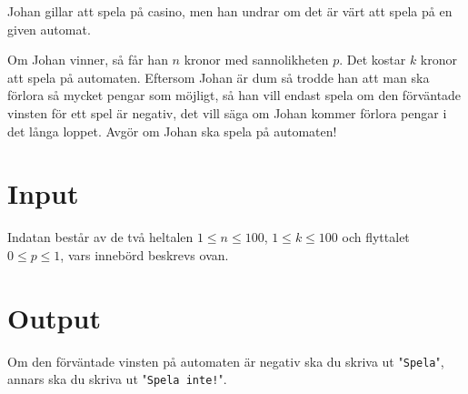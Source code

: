 

Johan gillar att spela på casino, men han undrar om det är värt att spela på en given automat. 

Om Johan vinner, så får han $n$ kronor med sannolikheten $p$.  Det kostar $k$ kronor att spela på automaten. Eftersom Johan är dum så trodde han att man ska förlora så mycket pengar som möjligt, så han vill endast spela om den förväntade vinsten för ett spel är negativ, det vill säga om Johan kommer förlora pengar i det långa loppet. Avgör om Johan ska spela på automaten!

\section*{Input}
Indatan består av de två heltalen $1 \le n \le 100$, $1 \le k \le 100$ och flyttalet $0 \le p \le 1$, vars innebörd beskrevs ovan.

\section*{Output}
Om den förväntade vinsten på automaten är negativ ska du skriva ut "\texttt{Spela}", annars ska du skriva ut "\texttt{Spela inte!}".
